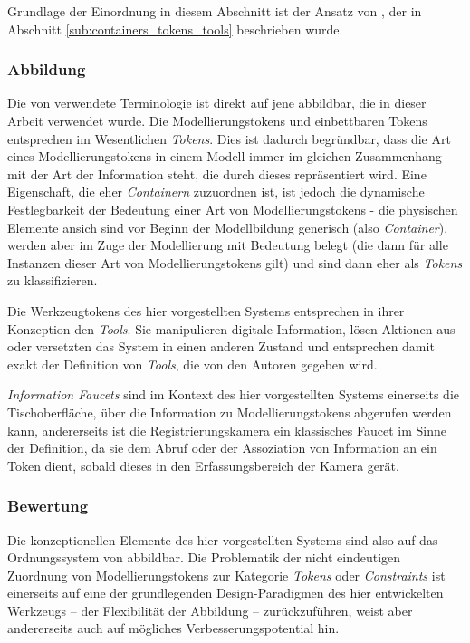 Grundlage der Einordnung in diesem Abschnitt ist der Ansatz von \citep{Holmquist99}, der in Abschnitt \ref{sub:containers_tokens_tools} beschrieben wurde.

\subsubsection{Abbildung}

Die von \citeauthor{Holmquist99} verwendete Terminologie ist direkt auf jene abbildbar, die in dieser Arbeit verwendet wurde. Die Modellierungstokens und einbettbaren Tokens entsprechen im Wesentlichen \emph{Tokens}. Dies ist dadurch begründbar, dass die Art eines Modellierungstokens in einem Modell immer im gleichen Zusammenhang mit der Art der Information steht, die durch dieses repräsentiert wird. Eine Eigenschaft, die eher \emph{Containern} zuzuordnen ist, ist jedoch die dynamische Festlegbarkeit der Bedeutung einer Art von Modellierungstokens - die physischen Elemente ansich sind vor Beginn der Modellbildung generisch (also \emph{Container}), werden aber im Zuge der Modellierung mit Bedeutung belegt (die dann für alle Instanzen dieser Art von Modellierungstokens gilt) und sind dann eher als \emph{Tokens} zu klassifizieren. 

Die Werkzeugtokens des hier vorgestellten Systems entsprechen in ihrer Konzeption den \emph{Tools}. Sie manipulieren digitale Information, lösen Aktionen aus oder versetzten das System in einen anderen Zustand und entsprechen damit exakt der Definition von \emph{Tools}, die von den Autoren gegeben wird.

\emph{Information Faucets} sind im Kontext des hier vorgestellten Systems einerseits die Tischoberfläche, über die Information zu Modellierungstokens abgerufen werden kann, andererseits ist die Registrierungskamera ein klassisches Faucet im Sinne der Definition, da sie dem Abruf oder der Assoziation von Information an ein Token dient, sobald dieses in den Erfassungsbereich der Kamera gerät.

\subsubsection{Bewertung}

Die konzeptionellen Elemente des hier vorgestellten Systems sind also auf das Ordnungssystem von \citet{Holmquist99} abbildbar. Die Problematik der nicht eindeutigen Zuordnung von Modellierungstokens zur Kategorie \emph{Tokens} oder \emph{Constraints} ist einerseits auf eine der grundlegenden Design-Paradigmen des hier entwickelten Werkzeugs -- der Flexibilität der Abbildung -- zurückzuführen, weist aber andererseits auch auf mögliches Verbesserungspotential hin.

